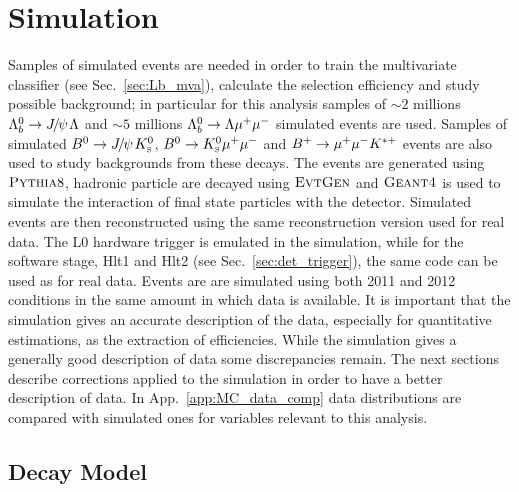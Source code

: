 \section{Simulation}
\label{sec:Lb_simulation}

Samples of simulated events are needed in order to train the multivariate classifier
(see Sec.~\ref{sec:Lb_mva}), calculate the selection efficiency and study possible background;
in particular for this analysis samples of $\sim 2$ millions $\Lb\to\jpsi\Lz$ and 
$\sim 5$ millions ${{\Lambda}^0_{b}}\rightarrow{\ensuremath{\Lambda}}{\ensuremath{\mu^+\mu^-}}$ simulated events are used.
Samples of simulated $\Bz\ra\jpsi\KS$, ${{B}^0}\rightarrow{\ensuremath{{K}^0_{\rm\scriptscriptstyle S}}}{\ensuremath{\mu^+\mu^-}}$ and $B^{+} \rightarrow{\ensuremath{\mu^+\mu^-}} K^{*+}$
events are also used to study backgrounds from these decays. The events are generated using
$\textsc{Pythia}8$, hadronic particle are decayed using $\textsc{EvtGen}$ and $\textsc{Geant4}$ is used to simulate
the interaction of final state particles with the detector. Simulated events are then
reconstructed using the same reconstruction version used for real data. The L0 hardware
trigger is emulated in the simulation, while for the software stage, Hlt1 and Hlt2
(see Sec.~\ref{sec:det_trigger}), the same code can be used as for real data.
Events are are simulated using both 2011 and 2012 conditions in the same amount in which data is available.
It is important that the simulation gives an accurate description of the data, especially
for quantitative estimations, as the extraction of efficiencies. While the simulation
gives a generally good description of data some discrepancies remain. The next sections
describe corrections applied to the simulation in order to have a better description of data.
In App.~\ref{app:MC_data_comp} data distributions are compared with simulated ones for
variables relevant to this analysis.

\subsection{Decay Model}
\label{decaymodel}

